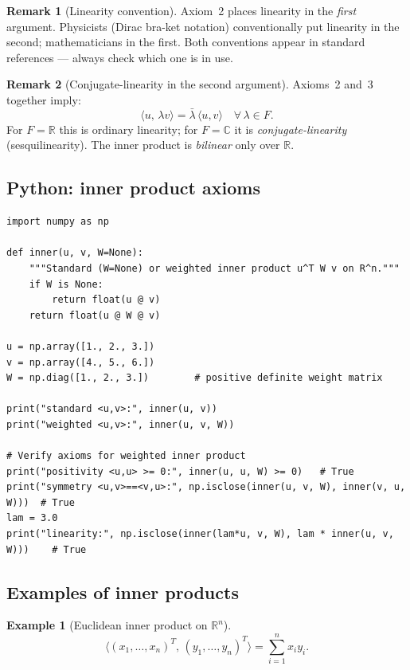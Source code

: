 \documentclass[11pt]{article}
\theoremstyle{definition}
\newtheorem{example}{Example}[section]
\newtheorem{remark}{Remark}[section]
\theoremstyle{plain}
\begin{document}
\begin{remark}[Linearity convention]
  Axiom~2 places linearity in the \emph{first} argument.  Physicists
  (Dirac bra-ket notation) conventionally put linearity in the second;
  mathematicians in the first.  Both conventions appear in standard
  references --- always check which one is in use.
\end{remark}

\begin{remark}[Conjugate-linearity in the second argument]
  Axioms~2 and~3 together imply:
  \[
    \langle u,\, \lambda v\rangle = \bar\lambda\,\langle u, v\rangle
    \quad \forall\,\lambda \in F.
  \]
  For $F = \mathbb{R}$ this is ordinary linearity; for $F = \mathbb{C}$
  it is \emph{conjugate-linearity} (sesquilinearity).
  The inner product is \emph{bilinear} only over $\mathbb{R}$.
\end{remark}

\subsection{Python: inner product axioms}
\begin{lstlisting}
import numpy as np

def inner(u, v, W=None):
    """Standard (W=None) or weighted inner product u^T W v on R^n."""
    if W is None:
        return float(u @ v)
    return float(u @ W @ v)

u = np.array([1., 2., 3.])
v = np.array([4., 5., 6.])
W = np.diag([1., 2., 3.])        # positive definite weight matrix

print("standard <u,v>:", inner(u, v))
print("weighted <u,v>:", inner(u, v, W))

# Verify axioms for weighted inner product
print("positivity <u,u> >= 0:", inner(u, u, W) >= 0)   # True
print("symmetry <u,v>==<v,u>:", np.isclose(inner(u, v, W), inner(v, u, W)))  # True
lam = 3.0
print("linearity:", np.isclose(inner(lam*u, v, W), lam * inner(u, v, W)))    # True
\end{lstlisting}

\subsection{Examples of inner products}

\begin{example}[Euclidean inner product on $\mathbb{R}^n$]
  \[
    \langle (x_1,\ldots,x_n)^T,\, (y_1,\ldots,y_n)^T\rangle
    = \sum_{i=1}^n x_i y_i.
  \]
\end{example}
\end{document}
